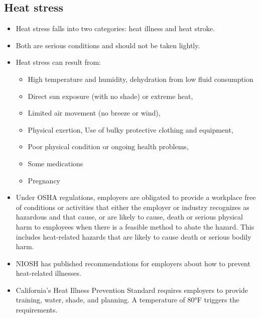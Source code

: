 \subsection{Heat stress}
\begin{itemize}
\item Heat stress falls into two categories: heat illness and heat stroke. 
\item Both are serious conditions and should not be taken lightly. 
\item Heat stress can result from: 
\begin{itemize}
\item High temperature and humidity, dehydration from low fluid consumption
\item Direct sun exposure (with no shade) or extreme heat, 
\item Limited air movement (no breeze or wind), 
\item Physical exertion, Use of bulky protective clothing and equipment, 
\item Poor physical condition or ongoing health problems, 
\item Some medications
\item Pregnancy
\end{itemize}
\item Under OSHA regulations, employers are obligated to provide a workplace free of conditions or activities that either the employer or industry recognizes as hazardous and that cause, or are likely to cause, death or serious physical harm to employees when there is a feasible method to abate the hazard. This includes heat-related hazards that are likely to cause death or serious bodily harm.
\item NIOSH  has published recommendations for employers about how to prevent heat-related illnesses.
\item California's Heat Illness Prevention Standard requires employers to provide training, water, shade, and planning. A temperature of 80°F triggers the requirements. 
\end{itemize} 

